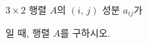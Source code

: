 $3\times 2$ 행렬 $A$의 $(i,\,j)$ 성분 $a_{ij}$가\par\smallskip{}\par\smallskip\noindent 일 때, 행렬 $A$를 구하시오.
